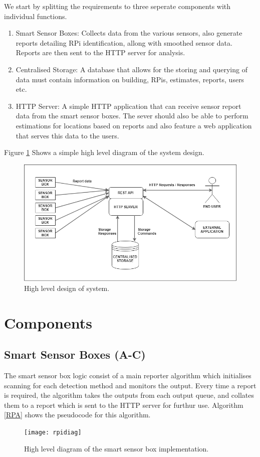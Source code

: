 \documentclass{l4proj}
\begin{document}
We start by splitting the requirements to three seperate components with individual functions.
\begin{enumerate}
  \item Smart Sensor Boxes:
	Collects data from the various sensors, also generate reports detailing RPi identification, allong with smoothed sensor data. Reports are then sent to the HTTP server for analysis. 
  \item Centralised Storage:
	A database that allows for the storing and querying of data must contain information on building, RPis, estimates, reports, users etc.
  \item HTTP Server:
	A simple HTTP application that can receive sensor report data from the smart sensor boxes. The sever should also be able to perform estimations for locations based on reports and also feature a web application that serves this data to the users. 
\end{enumerate}
Figure \ref{fig:overalldiag} Shows a simple high level diagram of the system design.
\begin{figure}
\centering
\includegraphics[width=\textwidth]{overalldiag}
\caption{High level design of system.}
\label{fig:overalldiag}
\end{figure}


\section{Components}
\subsection{Smart Sensor Boxes (A-C)}
The smart sensor box logic consist of a main reporter algorithm which initialises scanning for each detection method and monitors the output. Every time a report is required, the algorithm takes the outputs from each output queue, and collates them to a report which is sent to the HTTP server for furthur use.  Algorithm \ref{RPA} shows the pseudocode for this algorithm.
\begin{figure}
\centering
\texttt{[image: rpidiag]}
\caption{High level diagram of the smart sensor box implementation.}
\label{fig:rpidiag}
\end{figure}
\end{document}
